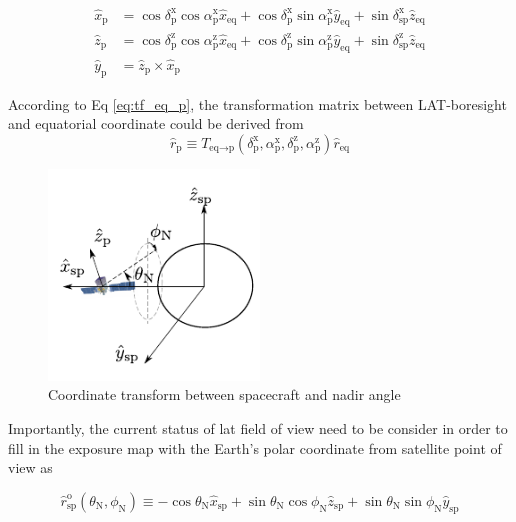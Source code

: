 \begin{equation}
    \begin{split}
    \hat{x}_\text{p} &= \cos\delta^\text{x}_\text{p}\cos\alpha^\text{x}_\text{p}\hat{x}_\text{eq} + \cos\delta^\text{x}_\text{p}\sin\alpha^\text{x}_\text{p}\hat{y}_\text{eq} + \sin\delta^\text{x}_\text{sp}\hat{z}_\text{eq}\\
    \hat{z}_\text{p} &= \cos\delta^\text{z}_\text{p}\cos\alpha^\text{z}_\text{p}\hat{x}_\text{eq} + \cos\delta^\text{z}_\text{p}\sin\alpha^\text{z}_\text{p}\hat{y}_\text{eq} + \sin\delta^\text{z}_\text{sp}\hat{z}_\text{eq}\\
    \hat{y}_\text{p} &= \hat{z}_\text{p} \times \hat{x}_\text{p}
    \end{split}
    \label{eq:tf_eq_p}
\end{equation}

According to Eq \ref{eq:tf_eq_p}, the transformation matrix between LAT-boresight and equatorial coordinate could be derived from
\begin{equation}
    \hat{r}_\text{p} \equiv T_{\text{eq}\rightarrow\text{p}} (\delta^\text{x}_\text{p}, \alpha^\text{x}_\text{p}, \delta^\text{z}_\text{p}, \alpha^\text{z}_\text{p}) \hat{r}_\text{eq}
\end{equation}

\begin{figure}[h!]
    \centering
    \includegraphics[width=0.5\textwidth]{img/fig_coordinate/coord_eq_p.pdf}
    \caption{Coordinate transform between spacecraft and nadir angle}
\end{figure}

Importantly, the current status of lat field of view need to be consider in order to fill in the exposure map with the Earth’s polar coordinate from satellite point of view as 

\begin{equation}
    \hat{r}^\text{o}_\text{sp} (\theta_\text{N}, \phi_\text{N}) \equiv -\cos\theta_\text{N}\hat{x}_\text{sp} + \sin\theta_\text{N}\cos\phi_\text{N}\hat{z}_\text{sp} + \sin\theta_\text{N}\sin\phi_\text{N}\hat{y}_\text{sp}
    \label{eq:def_r0}
\end{equation}


